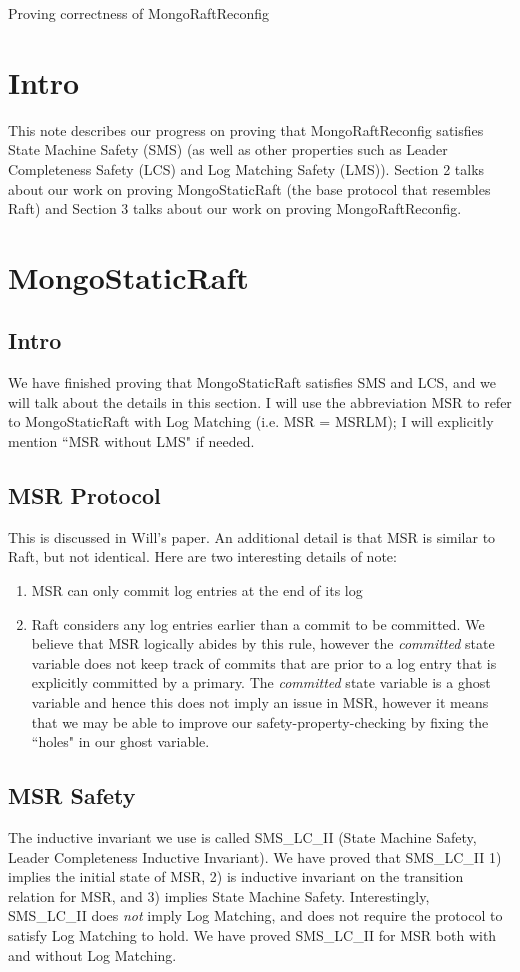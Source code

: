 \documentclass[12pt]{article}
\begin{document}
\noindent Proving correctness of MongoRaftReconfig

\section{Intro}
This note describes our progress on proving that MongoRaftReconfig satisfies State Machine Safety (SMS) (as well as other properties such as Leader Completeness Safety (LCS) and Log Matching Safety (LMS)).  Section 2 talks about our work on proving MongoStaticRaft (the base protocol that resembles Raft) and Section 3 talks about our work on proving MongoRaftReconfig.  

\section{MongoStaticRaft}

\subsection{Intro}
We have finished proving that MongoStaticRaft satisfies SMS and LCS, and we will talk about the details in this section.  I will use the abbreviation MSR to refer to MongoStaticRaft with Log Matching (i.e. MSR = MSRLM); I will explicitly mention ``MSR without LMS" if needed.  

\subsection{MSR Protocol}
This is discussed in Will's paper.  An additional detail is that MSR is similar to Raft, but not identical.  Here are two interesting details of note:
\begin{enumerate}
	\item MSR can only commit log entries at the end of its log
	\item Raft considers any log entries earlier than a commit to be committed.  We believe that MSR logically abides by this rule, however the \textit{committed} state variable does not keep track of commits that are prior to a log entry that is explicitly committed by a primary.  The \textit{committed} state variable is a ghost variable and hence this does not imply an issue in MSR, however it means that we may be able to improve our safety-property-checking by fixing the ``holes" in our ghost variable.  
\end{enumerate}

\subsection{MSR Safety}
The inductive invariant we use is called SMS\_LC\_II (State Machine Safety, Leader Completeness Inductive Invariant).  We have proved that SMS\_LC\_II 1) implies the initial state of MSR, 2) is inductive invariant on the transition relation for MSR, and 3) implies State Machine Safety.  Interestingly, SMS\_LC\_II does \textit{not} imply Log Matching, and does not require the protocol to satisfy Log Matching to hold.  We have proved SMS\_LC\_II for MSR both with and without Log Matching.  
\end{document}
